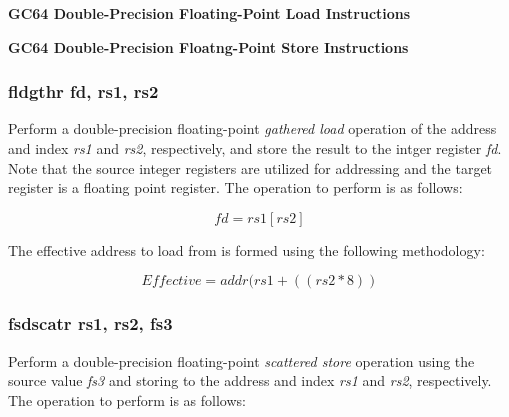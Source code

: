 \documentclass{article}
\begin{document}
\begin{center}
\textbf{GC64 Double-Precision Floating-Point Load Instructions}
\makebox[0.03in][s]{}\makebox[0.03in][s]{}\makebox[0.03in][s]{}\makebox[0.03in][s]{}\makebox[0.03in][s]{}
\end{center}

\begin{center}
\textbf{GC64 Double-Precision Floatng-Point Store Instructions}
\makebox[0.03in][s]{}\makebox[0.03in][s]{}\makebox[0.03in][s]{}\makebox[0.03in][s]{}\makebox[0.03in][s]{}
\end{center}


\subsubsection{fldgthr fd, rs1, rs2}

Perform a double-precision floating-point \emph{gathered load} operation of the
address and index \emph{rs1} and \emph{rs2}, respectively, and store the result
to the intger register \emph{fd}.  Note that the source integer registers are
utilized for addressing and the target register is a floating point register.
The operation to perform is as follows:

\begin{equation}
fd = rs1[rs2]
\end{equation}

The effective address to load
from is formed using the following methodology:

\begin{equation}
Effective = addr(rs1 + ((rs2 * 8))
\end{equation}


\subsubsection{fsdscatr rs1, rs2, fs3}

Perform a double-precision floating-point \emph{scattered store} operation 
using the source value \emph{fs3} and storing to the address and index
\emph{rs1} and \emph{rs2}, respectively.  The operation to
perform is as follows: 
\end{document}
